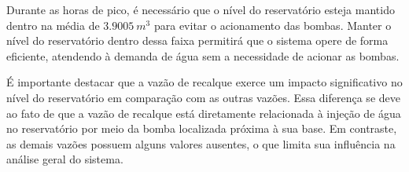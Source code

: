 Durante as horas de pico, é necessário que o nível do reservatório esteja mantido dentro na média de $3.9005 \ m^3$ para evitar o acionamento das bombas. Manter o nível do reservatório dentro dessa faixa permitirá que o sistema opere de forma eficiente, atendendo à demanda de água sem a necessidade de acionar as bombas.

É importante destacar que a vazão de recalque exerce um impacto significativo no nível do reservatório em comparação com as outras vazões. Essa diferença se deve ao fato de que a vazão de recalque está diretamente relacionada à injeção de água no reservatório por meio da bomba localizada próxima à sua base. Em contraste, as demais vazões possuem alguns valores ausentes, o que limita sua influência na análise geral do sistema.







